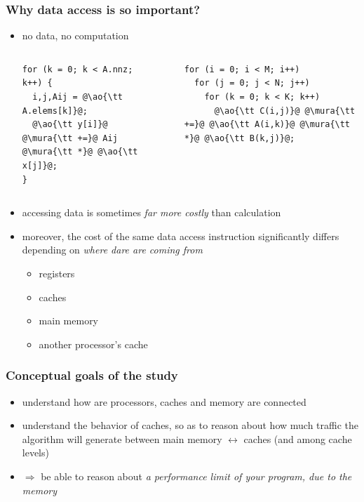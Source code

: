 \documentclass[12pt,dvipdfmx]{beamer}
\newcommand{\mura}[1]{{\color{purple}#1}}
\newcommand{\ao}[1]{{\color{blue}#1}}
\newcommand{\aka}[1]{{\color{red}#1}}
\begin{document}
\begin{frame}[fragile]
\frametitle{Why data access is so important?}
\begin{itemize}
\item<1-> no \ao{data}, no \mura{computation}
  \begin{columns}
    \begin{column}{0.42\textwidth}
\begin{lstlisting}
for (k = 0; k < A.nnz; k++) {
  i,j,Aij = @\ao{\tt A.elems[k]}@;
  @\ao{\tt y[i]}@ @\mura{\tt +=}@ Aij @\mura{\tt *}@ @\ao{\tt x[j]}@;
}
\end{lstlisting}
    \end{column}
    \begin{column}{0.03\textwidth}
    \end{column}
    \begin{column}{0.42\textwidth}
\begin{lstlisting}
for (i = 0; i < M; i++)  
  for (j = 0; j < N; j++)  
    for (k = 0; k < K; k++)  
      @\ao{\tt C(i,j)}@ @\mura{\tt +=}@ @\ao{\tt A(i,k)}@ @\mura{\tt *}@ @\ao{\tt B(k,j)}@;
\end{lstlisting}
    \end{column}
  \end{columns}


\item<2-> accessing data is sometimes 
  \aka{\it far more costly} than calculation
\item<3-> moreover, the cost of the same data access instruction
  significantly differs
  depending on \ao{\em where dare are coming from}
  \begin{itemize}
  \item registers
  \item caches
  \item main memory
  \item another processor's cache
  \end{itemize}
\end{itemize}
\end{frame}

\begin{frame}
\frametitle{Conceptual goals of the study}
\begin{itemize}
\item understand how are processors, caches and memory are connected
\item understand the behavior of caches,
  so as to reason about how much traffic the algorithm will generate
  between main memory $\leftrightarrow$ caches
  (and among cache levels)
\item $\Rightarrow$ be able to reason about 
  \ao{\emph{a performance limit of your program,
      due to the memory}}
\end{itemize}
\end{frame}
\end{document}
